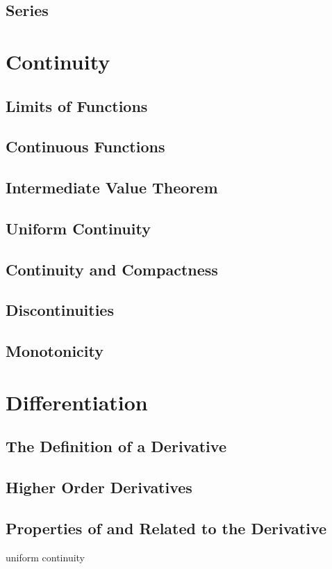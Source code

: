 \documentclass{article}
\theoremstyle{definition}
\begin{document}
\subsection{Series}

\section{Continuity}
\subsection{Limits of Functions}
\subsection{Continuous Functions}
\subsection{Intermediate Value Theorem}
\subsection{Uniform Continuity}
\subsection{Continuity and Compactness}
\subsection{Discontinuities}
\subsection{Monotonicity}
\section{Differentiation}
\subsection{The Definition of a Derivative}
\subsection{Higher Order Derivatives}

\subsection{Properties of and Related to the Derivative}
uniform continuity
\end{document}

